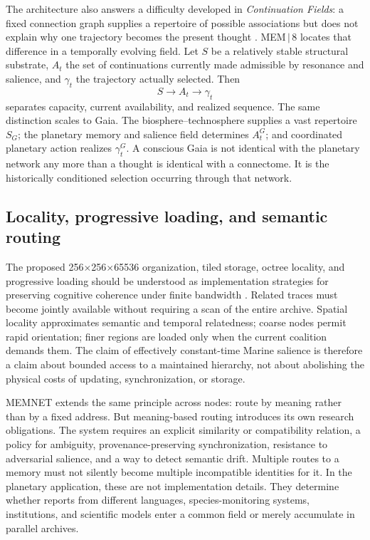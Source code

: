 \documentclass[11pt]{article}
\begin{document}
The architecture also answers a difficulty developed in \emph{Continuation Fields}: a fixed connection graph supplies a repertoire of possible associations but does not explain why one trajectory becomes the present thought \cite{flyxionContinuation}. MEM\,$|$\,8 locates that difference in a temporally evolving field. Let $S$ be a relatively stable structural substrate, $A_t$ the set of continuations currently made admissible by resonance and salience, and $\gamma_t$ the trajectory actually selected. Then
\[
S \longrightarrow A_t \longrightarrow \gamma_t
\]
separates capacity, current availability, and realized sequence. The same distinction scales to Gaia. The biosphere--technosphere supplies a vast repertoire $S_G$; the planetary memory and salience field determines $A_t^G$; and coordinated planetary action realizes $\gamma_t^G$. A conscious Gaia is not identical with the planetary network any more than a thought is identical with a connectome. It is the historically conditioned selection occurring through that network.

\subsection{Locality, progressive loading, and semantic routing}

The proposed 256$\times$256$\times$65536 organization, tiled storage, octree locality, and progressive loading should be understood as implementation strategies for preserving cognitive coherence under finite bandwidth \cite{flyxionMem8Design,flyxionAdaptive}. Related traces must become jointly available without requiring a scan of the entire archive. Spatial locality approximates semantic and temporal relatedness; coarse nodes permit rapid orientation; finer regions are loaded only when the current coalition demands them. The claim of effectively constant-time Marine salience is therefore a claim about bounded access to a maintained hierarchy, not about abolishing the physical costs of updating, synchronization, or storage.

MEMNET extends the same principle across nodes: route by meaning rather than by a fixed address. But meaning-based routing introduces its own research obligations. The system requires an explicit similarity or compatibility relation, a policy for ambiguity, provenance-preserving synchronization, resistance to adversarial salience, and a way to detect semantic drift. Multiple routes to a memory must not silently become multiple incompatible identities for it. In the planetary application, these are not implementation details. They determine whether reports from different languages, species-monitoring systems, institutions, and scientific models enter a common field or merely accumulate in parallel archives.
\end{document}
